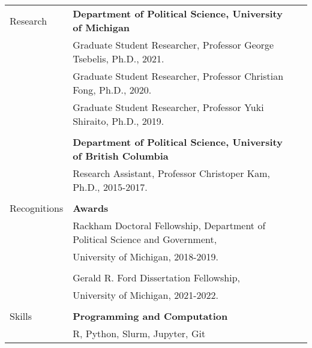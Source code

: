 \documentclass[letterpaper,11pt,oneside]{article}
\begin{document}
\begin{tabular}{@{} l l l}
  \Large{Research}
                      & \textbf{Department of Political Science, University of Michigan} \\
                      & Graduate Student Researcher, Professor George Tsebelis, Ph.D., 2021. \\
                      & Graduate Student Researcher, Professor Christian Fong, Ph.D., 2020. \\
                      & Graduate Student Researcher, Professor Yuki Shiraito, Ph.D., 2019. \\
  \\
                      & \textbf{Department of Political Science, University of British Columbia} \\
                      & Research Assistant, Professor Christoper Kam, Ph.D., 2015-2017. \\
                      & \\

  \Large{Recognitions}   & \textbf{Awards} \\
                      & Rackham Doctoral Fellowship, Department of Political Science and Government, \\
                      & University of Michigan, 2018-2019. \\
  \\
                      & Gerald R. Ford Dissertation Fellowship, \\
                      & University of Michigan, 2021-2022. \\
                      & \\

  \Large{Skills}
                      & \textbf{Programming and Computation} \\
                      & R, Python, Slurm, Jupyter, Git \\

\end{tabular}
\end{document}
